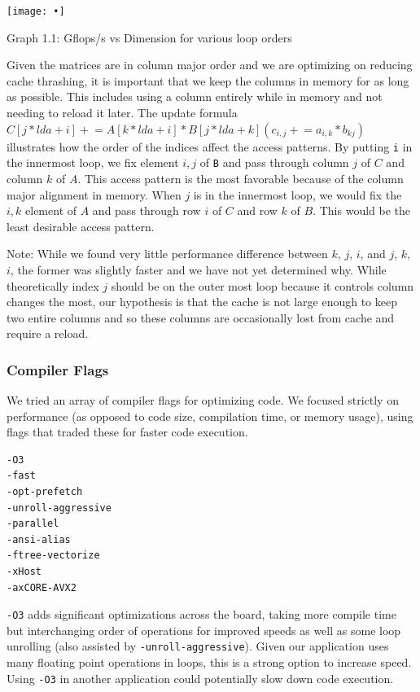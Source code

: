 \documentclass[12pt]{article}
\begin{document}
\begin{center}
\texttt{[image: •]}

\end{center}
Graph 1.1: Gflops/s vs Dimension for various loop orders


Given the matrices are in column major order and we are optimizing on reducing cache thrashing, it is important that we keep the columns in memory for as long as possible. This includes using a column entirely while in memory and not needing to reload it later. The update formula $C[j*lda+i] \mathrel{+}= A[k*lda+i] * B[j*lda+k] (c_{i,j} \mathrel{+}= a_{i,k} * b_{kj})$ illustrates how the order of the indices affect the access patterns. By putting \texttt{i} in the innermost loop, we fix element $i,j$ of \texttt{B} and pass through column $j$ of $C$ and column $k$ of $A$. This access pattern is the most favorable because of the column major alignment in memory. When $j$ is in the innermost loop, we would fix the $i,k$ element of $A$ and pass through row $i$ of $C$ and row $k$ of $B$. This would be the least desirable access pattern.

Note: While we found very little performance difference between $k$, $j$, $i$, and $j$, $k$, $i$, the former was slightly faster and we have not yet determined why. While theoretically index $j$ should be on the outer most loop because it controls column changes the most, our hypothesis is that the cache is not large enough to keep two entire columns and so these columns are occasionally lost from cache and require a reload.   

\subsubsection{Compiler Flags}

We tried an array of compiler flags for optimizing code. We focused strictly on performance (as opposed to code size, compilation time, or memory usage), using flags that traded these for faster code execution.

\begin{multicols}{3}
\begin{verbatim}
-O3 
-fast 
-opt-prefetch 
-unroll-aggressive
-parallel 
-ansi-alias 
-ftree-vectorize 
-xHost 
-axCORE-AVX2 
\end{verbatim}
\end{multicols}


\texttt{-O3} adds significant optimizations across the board, taking more compile time but interchanging order of operations for improved speeds as well as some loop unrolling (also assisted by \texttt{-unroll-aggressive}). Given our application uses many floating point operations in loops, this is a strong option to increase speed. Using \texttt{-O3} in another application could potentially slow down code execution.
\end{document}
